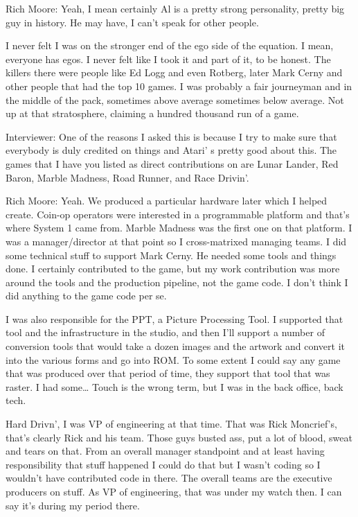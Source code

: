 \textcolor{interviewee}{Rich Moore:} Yeah, I mean certainly Al is a pretty strong personality, pretty big guy in history. He may have, I can't speak for other people.

I never felt I was on the stronger end of the ego side of the equation. I mean, everyone has egos. I never felt like I took it and part of it, to be honest. The killers there were people like Ed Logg and even Rotberg, later Mark Cerny and other people that had the top 10 games. I was probably a fair journeyman and in the middle of the pack, sometimes above average sometimes below average. Not up at that stratosphere, claiming a hundred thousand run of a game.

\textcolor{interviewer}{Interviewer:} One of the reasons I asked this is because I try to make sure that everybody is duly credited on things and Atari’ s pretty good about this. The games that I have you listed as direct contributions on are Lunar Lander, Red Baron, Marble Madness, Road Runner, and Race Drivin’.

\textcolor{interviewee}{Rich Moore:} Yeah. We produced a particular hardware later which I helped create. Coin-op operators were interested in a programmable platform and that’s where System 1 came from. Marble Madness was the first one on that platform. I was a manager/director at that point so I cross-matrixed managing teams. I did some technical stuff to support Mark Cerny. He needed some tools and things done. I certainly contributed to the game, but my work contribution was more around the tools and the production pipeline, not the game code. I don't think I did anything to the game code per se.

I was also responsible for the PPT, a Picture Processing Tool. I supported that tool and the infrastructure in the studio, and then I'll support a number of conversion tools that would take a dozen images and the artwork and convert it into the various forms and go into ROM. To some extent I could say any game that was produced over that period of time, they support that tool that was raster. I had some… Touch is the wrong term, but I was in the back office, back tech.

Hard Drivn’, I was VP of engineering at that time. That was Rick Moncrief’s, that's clearly Rick and his team. Those guys busted ass, put a lot of blood, sweat and tears on that. From an overall manager standpoint and at least having responsibility that stuff happened I could do that but I wasn't coding so I wouldn't have contributed code in there. The overall teams are the executive producers on stuff. As VP of engineering, that was under my watch then. I can say it's during my period there.

